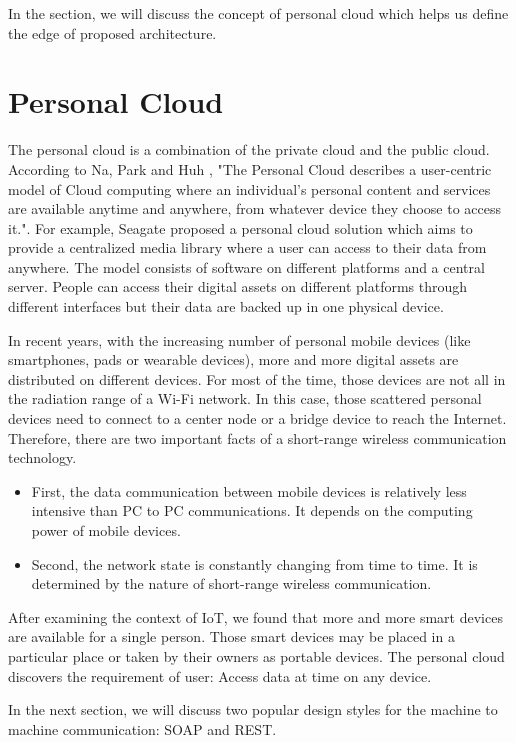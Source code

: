 \documentclass{Nan_Thesis}
\begin{document}
In the section, we will discuss the concept of personal cloud which helps us define the edge of proposed architecture.

\section{Personal Cloud} 
The personal cloud is a combination of the private cloud and the public cloud. According to Na, Park and Huh \cite{na2010personal}, "The Personal Cloud describes a user-centric model of Cloud computing where an individual's personal content and services are available anytime and anywhere, from whatever device they choose to access it.". For example, Seagate proposed a personal cloud solution \cite{seagate2016whatispersonalcloud} which aims to provide a centralized media library where a user can access to their data from anywhere. The model consists of software on different platforms and a central server. People can access their digital assets on different platforms through different interfaces but their data are backed up in one physical device. 

In recent years, with the increasing number of personal mobile devices (like smartphones, pads or wearable devices), more and more digital assets are distributed on different devices. For most of the time, those devices are not all in the radiation range of a Wi-Fi network. In this case, those scattered personal devices need to connect to a center node or a bridge device to reach the Internet. Therefore, there are two important facts of a short-range wireless communication technology.

\begin{itemize}
  \item First, the data communication between mobile devices is relatively less intensive than PC to PC communications. It depends on the computing power of mobile devices.
  \item Second, the network state is constantly changing from time to time. It is determined by the nature of short-range wireless communication. 
\end{itemize}

After examining the context of IoT, we found that more and more smart devices are available for a single person. Those smart devices may be placed in a particular place or taken by their owners as portable devices. The personal cloud discovers the requirement of user: Access data at time on any device.

In the next section, we will discuss two popular design styles for the machine to machine communication: SOAP and REST. 
\end{document}
